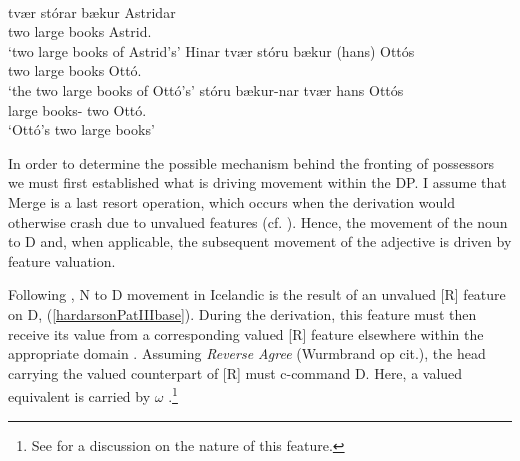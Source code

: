 \documentclass[output=paper,colorlinks,citecolor=brown,
]{langscibook}
\begin{document}
\begin{exe}
\setlength{\columnsep}{-70pt}
\begin{multicols}{2}
		\ex	~ \label{hardarsonFullesque}\\
		\ex \begin{xlist}
				
					\ex	\gll	tvær stórar bækur Astridar \label{hardarsonND}\\
								two large books Astrid.\hardGen{}\\
						\glt	`two large books of Astrid's'
					\ex	\gll	Hinar tvær stóru bækur (hans) Ottós\label{hardarsonFD}\\
								\hardArt{} two large books \hardProp{} Ottó.\hardGen{}\\
						\glt	`the two large books of Ottó's'
					\ex	\gll	stóru bækur-nar tvær hans Ottós \label{hardarsonBD}\\
								large books-\hardArt{} two \hardProp{} Ottó.\hardGen\\
						\glt	`Ottó's two large books'
			\end{xlist}
\end{multicols}
\end{exe}

In order to determine the possible mechanism behind the fronting of possessors we must first established what is driving movement within the DP. 
I assume that Merge is a last resort operation, which occurs when the derivation would otherwise crash due to unvalued features (cf. \citealt{abels2003,boskovic2007,AgreementLooking:2012wf,Wurmbrand:2013tf,Wurmbrand:2012ty,Wurmbrand:uv,Wurmbrand:2014vz,Wurmbrand:2011ua,Wurmbrand:2013tb}). Hence, the movement of the noun to D and, when applicable, the subsequent movement of the adjective is driven by feature valuation.

Following \cite{Hardarson:2016wd}, N to D movement in Icelandic is the result of an unvalued [R] feature on D, (\ref{hardarsonPatIIIbase}). During the derivation, this feature must then receive its value from a corresponding valued [R] feature elsewhere within the appropriate domain \citep[e.g.,][]{pesetsky2007}. Assuming \textit{Reverse Agree} (Wurmbrand op cit.), the head carrying the valued counterpart of [R] must c-command D. Here, a valued equivalent is carried by $\omega$ \cite[147ff]{Hardarson:2016wd}.\footnote{See \cite[147ff]{Hardarson:2016wd} for a discussion on the nature of this feature.}
\end{document}
